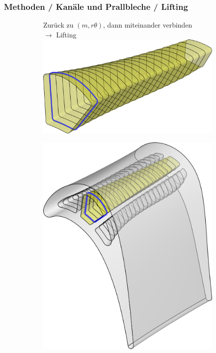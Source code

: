 \documentclass[8pt, aspectratio=169]{beamer}
\begin{document}
\begin{frame}
	\frametitle{Methoden / Kanäle und Prallbleche / Lifting}
	\vspace{-1cm}\hspace{-0.5cm}
	\begin{minipage}{\textwidth}
		\begin{figure}[H]
			\centering
			\begin{subfigure}{0.49\textwidth}
				Zurück zu $(m, r\theta)$, dann miteinander verbinden\\
				$\rightarrow$ Lifting\\

				\includegraphics[width=\textwidth]{../tec/lifting/lifted.png}
			\end{subfigure}
			\hspace{0.5cm}
			\begin{subfigure}{0.42\textwidth}
				\includegraphics[width=\textwidth]{../tec/lifting/complete.png}

\end{subfigure}
\end{figure}
\end{minipage}
\end{frame}
\end{document}
